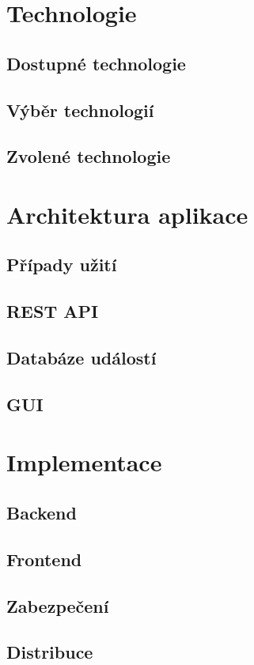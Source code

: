 \chapter{Technologie}
\section{Dostupné technologie}
\section{Výběr technologií}
\section{Zvolené technologie}

\chapter{Architektura aplikace}
\section{Případy užití}
\section{REST API}
\section{Databáze událostí}
\section{GUI}

\chapter{Implementace}
\section{Backend}
\section{Frontend}
\section{Zabezpečení}
\section{Distribuce}

